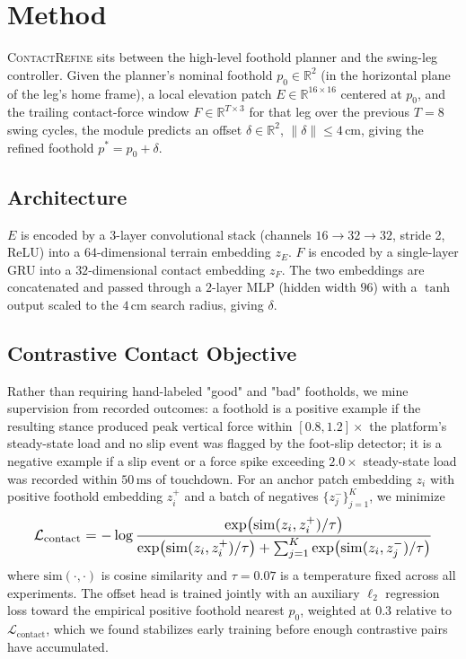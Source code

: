 \section{Method}
\textsc{ContactRefine} sits between the high-level foothold planner and the swing-leg
controller. Given the planner's nominal foothold $p_0 \in \mathbb{R}^2$ (in the horizontal
plane of the leg's home frame), a local elevation patch $E \in \mathbb{R}^{16\times 16}$
centered at $p_0$, and the trailing contact-force window $F \in \mathbb{R}^{T\times 3}$ for
that leg over the previous $T=8$ swing cycles, the module predicts an offset
$\delta \in \mathbb{R}^2$, $\lVert \delta \rVert \le 4\,\text{cm}$, giving the refined foothold
$p^\ast = p_0 + \delta$.

\subsection{Architecture}
$E$ is encoded by a $3$-layer convolutional stack (channels $16\!\to\!32\!\to\!32$, stride 2,
ReLU) into a $64$-dimensional terrain embedding $z_E$. $F$ is encoded by a single-layer GRU
into a $32$-dimensional contact embedding $z_F$. The two embeddings are concatenated and
passed through a $2$-layer MLP (hidden width $96$) with a $\tanh$ output scaled to the
$4\,\text{cm}$ search radius, giving $\delta$.

\subsection{Contrastive Contact Objective}
Rather than requiring hand-labeled "good" and "bad" footholds, we mine supervision from
recorded outcomes: a foothold is a positive example if the resulting stance produced peak
vertical force within $[0.8, 1.2]\times$ the platform's steady-state load and no slip event
was flagged by the foot-slip detector; it is a negative example if a slip event or a force
spike exceeding $2.0\times$ steady-state load was recorded within $50\,\text{ms}$ of touchdown.
For an anchor patch embedding $z_i$ with positive foothold embedding $z_i^{+}$ and a batch of
negatives $\{z_j^{-}\}_{j=1}^{K}$, we minimize
\begin{equation}
\resizebox{0.92\linewidth}{!}{$\displaystyle
\mathcal{L}_{\text{contact}} = -\log \frac{\exp\!\big(\mathrm{sim}(z_i, z_i^{+})/\tau\big)}
{\exp\!\big(\mathrm{sim}(z_i, z_i^{+})/\tau\big) + \sum_{j=1}^{K}\exp\!\big(\mathrm{sim}(z_i, z_j^{-})/\tau\big)}
$}
\label{eq:contrastive}
\end{equation}
where $\mathrm{sim}(\cdot,\cdot)$ is cosine similarity and $\tau = 0.07$ is a temperature
fixed across all experiments. The offset head is trained jointly with an auxiliary
$\ell_2$ regression loss toward the empirical positive foothold nearest $p_0$, weighted at
$0.3$ relative to $\mathcal{L}_{\text{contact}}$, which we found stabilizes early training
before enough contrastive pairs have accumulated.

